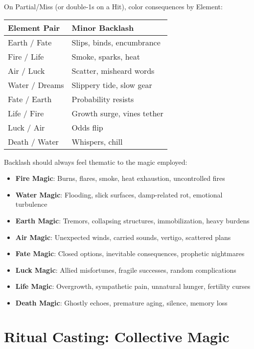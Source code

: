 On Partial/Miss (or double-1s on a Hit), color consequences by Element:

\begin{fatebox}
\begin{tabularx}{\textwidth}{lX}
\toprule
\textbf{Element Pair} & \textbf{Minor Backlash} \\
\midrule
Earth / Fate & Slips, binds, encumbrance \\
Fire / Life & Smoke, sparks, heat \\
Air / Luck & Scatter, misheard words \\
Water / Dreams & Slippery tide, slow gear \\
Fate / Earth & Probability resists \\
Life / Fire & Growth surge, vines tether \\
Luck / Air & Odds flip \\
Death / Water & Whispers, chill \\
\bottomrule
\end{tabularx}
\end{fatebox}

Backlash should always feel thematic to the magic employed:
\begin{itemize}
    \item \textbf{Fire Magic}: Burns, flares, smoke, heat exhaustion, uncontrolled fires
    \item \textbf{Water Magic}: Flooding, slick surfaces, damp-related rot, emotional turbulence
    \item \textbf{Earth Magic}: Tremors, collapsing structures, immobilization, heavy burdens
    \item \textbf{Air Magic}: Unexpected winds, carried sounds, vertigo, scattered plans
    \item \textbf{Fate Magic}: Closed options, inevitable consequences, prophetic nightmares
    \item \textbf{Luck Magic}: Allied misfortunes, fragile successes, random complications
    \item \textbf{Life Magic}: Overgrowth, sympathetic pain, unnatural hunger, fertility curses
    \item \textbf{Death Magic}: Ghostly echoes, premature aging, silence, memory loss
\end{itemize}

\section*{Ritual Casting: Collective Magic}

